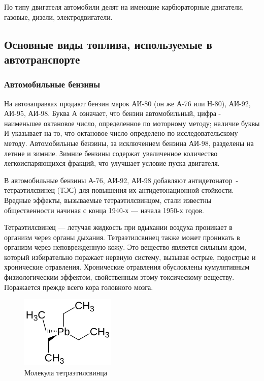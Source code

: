 По типу двигателя автомобили делят на имеющие карбюраторные двигатели, газовые, дизели, электродвигатели.








\subsection{Основные виды топлива, используемые в автотранспорте}

\subsubsection{Автомобильные бензины}

На автозаправках продают бензин марок \mbox{АИ-80} (он же \mbox{А-76} или \mbox{Н-80}), \mbox{АИ-92}, \mbox{АИ-95}, \mbox{АИ-98}.
Буква А означает, что бензин автомобильный, цифра - наименьшее октановое число, определенное по моторному методу; наличие буквы И указывает на то, что октановое число определено по исследовательскому методу. Автомобильные бензины, за исключением бензина \mbox{АИ-98}, разделены на летние и зимние. Зимние бензины содержат увеличенное количество легкоиспаряющихся фракций, что улучшает условие пуска двигателя.

В автомобильные бензины \mbox{А-76}, \mbox{АИ-92}, \mbox{АИ-98} добавляют антидетонатор~- тетраэтилсвинец (ТЭС) для повышения их антидетонационной стойкости. Вредные эффекты, вызываемые тетраэтилсвинцом, стали известны общественности начиная с конца 1940-х — начала 1950-х годов.

Тетраэтилсвинец — летучая жидкость при вдыхании воздуха проникает в организм через органы дыхания. Тетраэтилсвинец также может проникать в организм через неповрежденную кожу. Это вещество является сильным ядом, который избирательно поражает нервную систему, вызывая острые, подострые и хронические отравления. Хронические отравления обусловлены кумулятивным физиологическим эффектом, свойственным этому токсическому веществу. Поражается прежде всего кора головного мозга.


\begin{figure}[H]%
  \centering
  \includegraphics[width=0.4\textwidth]{src/tetraetilPb.png}
  \caption{Молекула тетраэтилсвинца} \label{p:k_marks}
\end{figure}%


